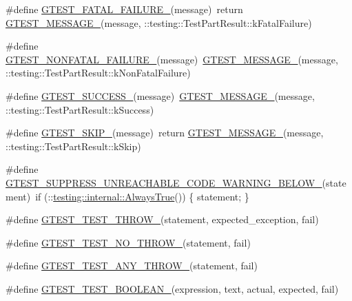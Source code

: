 \begin{DoxyCompactItemize}
\item 
\#define \hyperlink{gtest-internal_8h_a0f9a4c3ea82cc7bf4478eaffdc168358}{G\+T\+E\+S\+T\+\_\+\+F\+A\+T\+A\+L\+\_\+\+F\+A\+I\+L\+U\+R\+E\+\_\+}(message)~return \hyperlink{gtest-internal_8h_a94c73d5368ec946bc354d0992ad00810}{G\+T\+E\+S\+T\+\_\+\+M\+E\+S\+S\+A\+G\+E\+\_\+}(message, \+::testing\+::\+Test\+Part\+Result\+::k\+Fatal\+Failure)
\item 
\#define \hyperlink{gtest-internal_8h_a6cb7482cfa03661a91c698eb5895f642}{G\+T\+E\+S\+T\+\_\+\+N\+O\+N\+F\+A\+T\+A\+L\+\_\+\+F\+A\+I\+L\+U\+R\+E\+\_\+}(message)~\hyperlink{gtest-internal_8h_a94c73d5368ec946bc354d0992ad00810}{G\+T\+E\+S\+T\+\_\+\+M\+E\+S\+S\+A\+G\+E\+\_\+}(message, \+::testing\+::\+Test\+Part\+Result\+::k\+Non\+Fatal\+Failure)
\item 
\#define \hyperlink{gtest-internal_8h_abe012b550eb3807e8c49f7e161bd1567}{G\+T\+E\+S\+T\+\_\+\+S\+U\+C\+C\+E\+S\+S\+\_\+}(message)~\hyperlink{gtest-internal_8h_a94c73d5368ec946bc354d0992ad00810}{G\+T\+E\+S\+T\+\_\+\+M\+E\+S\+S\+A\+G\+E\+\_\+}(message, \+::testing\+::\+Test\+Part\+Result\+::k\+Success)
\item 
\#define \hyperlink{gtest-internal_8h_ab75ed7a6cd9e466944ce680c1c07ab47}{G\+T\+E\+S\+T\+\_\+\+S\+K\+I\+P\+\_\+}(message)~return \hyperlink{gtest-internal_8h_a94c73d5368ec946bc354d0992ad00810}{G\+T\+E\+S\+T\+\_\+\+M\+E\+S\+S\+A\+G\+E\+\_\+}(message, \+::testing\+::\+Test\+Part\+Result\+::k\+Skip)
\item 
\#define \hyperlink{gtest-internal_8h_a2e66f7dfc5cb87e0fa0289f653173c69}{G\+T\+E\+S\+T\+\_\+\+S\+U\+P\+P\+R\+E\+S\+S\+\_\+\+U\+N\+R\+E\+A\+C\+H\+A\+B\+L\+E\+\_\+\+C\+O\+D\+E\+\_\+\+W\+A\+R\+N\+I\+N\+G\+\_\+\+B\+E\+L\+O\+W\+\_\+}(statement)~if (\+::\hyperlink{namespacetesting_1_1internal_a4d46f09c3bfe68700b7f728d2cc3782f}{testing\+::internal\+::\+Always\+True}()) \{ statement; \}
\item 
\#define \hyperlink{gtest-internal_8h_a3f71db93eaf30b0cfca9612b9ac32106}{G\+T\+E\+S\+T\+\_\+\+T\+E\+S\+T\+\_\+\+T\+H\+R\+O\+W\+\_\+}(statement,  expected\+\_\+exception,  fail)
\item 
\#define \hyperlink{gtest-internal_8h_a9a109d026b5a904646437d7570e13581}{G\+T\+E\+S\+T\+\_\+\+T\+E\+S\+T\+\_\+\+N\+O\+\_\+\+T\+H\+R\+O\+W\+\_\+}(statement,  fail)
\item 
\#define \hyperlink{gtest-internal_8h_af48bbd26d54d4afc5e4cef39b1c76ba3}{G\+T\+E\+S\+T\+\_\+\+T\+E\+S\+T\+\_\+\+A\+N\+Y\+\_\+\+T\+H\+R\+O\+W\+\_\+}(statement,  fail)
\item 
\#define \hyperlink{gtest-internal_8h_ae8912365e1d00a7a2bd248268c64aa1a}{G\+T\+E\+S\+T\+\_\+\+T\+E\+S\+T\+\_\+\+B\+O\+O\+L\+E\+A\+N\+\_\+}(expression,  text,  actual,  expected,  fail)

\end{DoxyCompactItemize}
